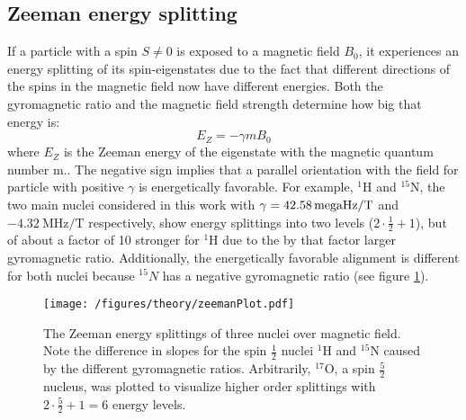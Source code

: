         \subsection{Zeeman energy splitting}
            If a particle with a spin $S\neq 0$ is exposed to a magnetic field $B_0$, it experiences an energy splitting of its spin-eigenstates due to the fact that different directions of the spins in the magnetic field now have different energies. Both the gyromagnetic ratio and the magnetic field strength determine how big that energy is:
            \begin{equation}
                E_{Z} = -\gamma m B_0
            \end{equation}
            where $E_Z$ is the Zeeman energy of the eigenstate with the magnetic quantum number m.\cite{gerlach_experimentelle_1989, bloch_nuclear_1946}. The negative sign implies that a parallel orientation with the field for particle with positive $\gamma$ is energetically favorable. For example, $^1$H and $^{15}$N, the two main nuclei considered in this work with $\gamma = \SI{42.58}{\\mega\hertz\per\tesla}$ and $\SI{-4.32}{\mega\hertz\per\tesla}$ respectively, show energy splittings into two levels ($2\cdot\tfrac{1}{2}+1$), but of about a factor of 10 stronger for $^1$H due to the by that factor larger gyromagnetic ratio. Additionally, the energetically favorable alignment is different for both nuclei because $^{15}N$ has a negative gyromagnetic ratio (see figure \ref{figure:theory:zeemanSplittings}).
            \begin{figure}
                \centering
                \texttt{[image: /figures/theory/zeemanPlot.pdf]}
                \caption[Zeeman energy splitting]{The Zeeman energy splittings of three nuclei over magnetic field. Note the difference in slopes for the spin $\tfrac{1}{2}$ nuclei $^1$H and $^{15}$N caused by the different gyromagnetic ratios. Arbitrarily, $^{17}$O, a spin $\tfrac{5}{2}$ nucleus, was plotted to visualize higher order splittings with $2 \cdot\tfrac{5}{2}+1 = 6$ energy levels. }
                \label{figure:theory:zeemanSplittings}
            \end{figure}

